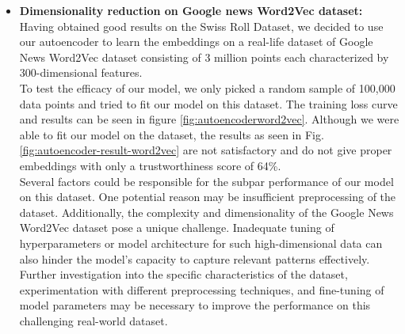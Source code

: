 \begin{itemize}
\begin{itemize}
            \item \textbf{Dimensionality reduction on Google news Word2Vec dataset: }\\
            Having obtained good results on the Swiss Roll Dataset, we decided to use our autoencoder to learn the embeddings on a real-life dataset of Google News Word2Vec dataset consisting of 3 million points each characterized by 300-dimensional features. \\
            To test the efficacy of our model, we only picked a random sample of 100,000 data points and tried to fit our model on this dataset. The training loss curve and results can be seen in figure \ref{fig:autoencoderword2vec}. Although we were able to fit our model on the dataset, the results as seen in Fig. \ref{fig:autoencoder-result-word2vec} are not satisfactory and do not give proper embeddings with only a trustworthiness score of 64\%. \\
            Several factors could be responsible for the subpar performance of our model on this dataset. One potential reason may be insufficient preprocessing of the dataset. Additionally, the complexity and dimensionality of the Google News Word2Vec dataset pose a unique challenge. Inadequate tuning of hyperparameters or model architecture for such high-dimensional data can also hinder the model's capacity to capture relevant patterns effectively. \\
            Further investigation into the specific characteristics of the dataset, experimentation with different preprocessing techniques, and fine-tuning of  model parameters may be necessary to improve the performance on this challenging real-world dataset.


\end{itemize}
\end{itemize}
